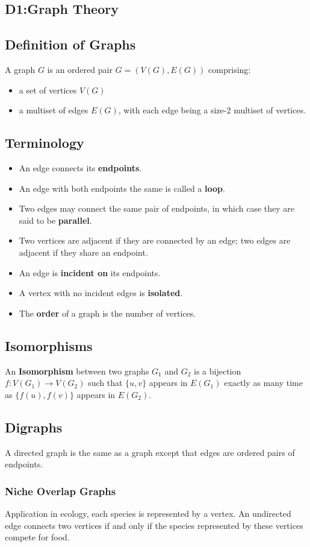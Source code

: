 \documentclass{article}
\begin{document}
\begin{spacing}{1.5}
\section{D1:Graph Theory}
\subsection{Definition of Graphs}
A graph $G$ is an ordered pair $G = (V(G),E(G)) $ comprising:
\begin{itemize}
    \item a set of vertices $V(G)$
    \item a multiset of edges $E(G)$, with each edge being a size-2 multiset of vertices. 
\end{itemize} 
\subsection{Terminology}
\begin{itemize}
    \item An edge connects its \textbf{endpoints}.
    \item An edge with both endpoints the same is called a \textbf{loop}.
    \item Two edges may connect the same pair of endpoints, in which case they are said to be \textbf{parallel}.
    \item Two vertices are adjacent if they are connected by an edge; two edges are adjacent if they share an endpoint. 
    \item An edge is \textbf{incident on} its endpoints.
    \item A vertex with no incident edges is \textbf{isolated}.
    \item The \textbf{order} of a graph is the number of vertices. 
\end{itemize}
\subsection{Isomorphisms}
An \textbf{Isomorphism} between two graphs $G_1$ and $G_2$ is a bijection $f:V(G_1) \rightarrow V(G_2)$ such that $\{u,v\}$ appears in $E(G_1)$ exactly as many time as $\{f(u),f(v)\}$ appears in $E(G_2)$.
\subsection{Digraphs}
A directed graph is the same as a graph except that edges are ordered pairs of endpoints.
\subsubsection{Niche Overlap Graphs}
Application in ecology, each species is represented by a vertex. An undirected edge connects two vertices if and only if the species represented by these vertices compete for food.

\end{spacing}
\end{document}
